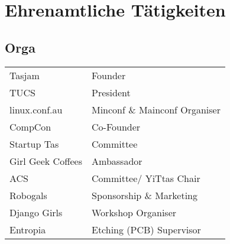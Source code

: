 \documentclass[a4paper]{deedy-resume_twopage} %
\begin{document}
\begin{minipage}[t]{0.33\textwidth} %





  \section{Ehrenamtliche Tätigkeiten}

  \subsection{Orga}
  \begin{tabular}{l p{}}
  Tasjam & Founder \\
  TUCS & President \\
  linux.conf.au & Minconf \& Mainconf Organiser \\
  CompCon & Co-Founder \\
  Startup Tas & Committee \\
  Girl Geek Coffees & Ambassador \\
  ACS & Committee/ YiTtas Chair \\
  Robogals & Sponsorship \& Marketing \\
  Django Girls & Workshop Organiser \\
  Entropia & Etching (PCB) Supervisor \\
  \end{tabular}


\end{minipage}
\end{document}

